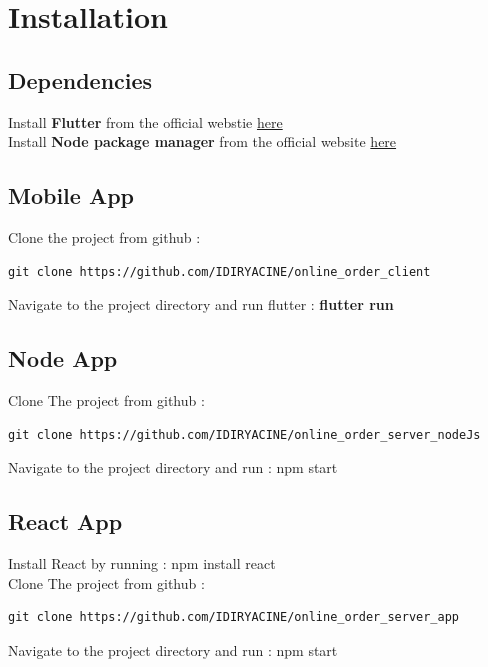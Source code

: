 \documentclass{article}
\begin{document}
\section{Installation}
\subsection{Dependencies}
Install \textbf{Flutter} from the official webstie \href{https://docs.flutter.dev/get-started/install}{here}\\
Install \textbf{Node package manager} from the official website \href{https://docs.npmjs.com/downloading-and-installing-node-js-and-npm}{here}\\
\subsection{Mobile App}
Clone the project from github :
\begin{verbatim}
git clone https://github.com/IDIRYACINE/online_order_client
\end{verbatim}
Navigate to the project directory and run flutter : \textbf{flutter run} 
\subsection{Node App}
Clone The project from github :
\begin{verbatim}
git clone https://github.com/IDIRYACINE/online_order_server_nodeJs
\end{verbatim}
Navigate to the project directory and run : npm start 
\subsection{React App}
Install React by running : npm install react \\
Clone The project from github : 
\begin{verbatim}
git clone https://github.com/IDIRYACINE/online_order_server_app
\end{verbatim}
Navigate to the project directory and run : npm start 



\newpage
\end{document}
